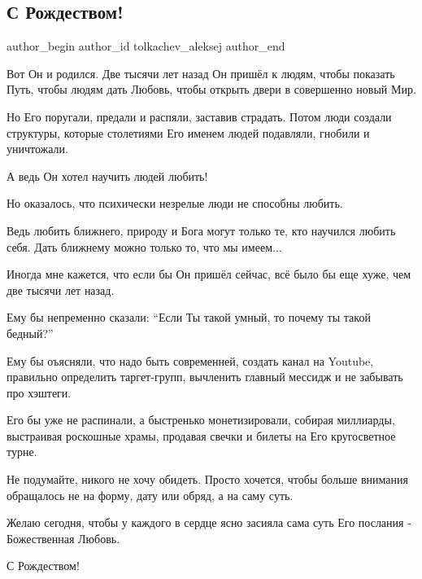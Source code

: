  
 
 
 
 
 
\subsection{С Рождеством!}
\label{sec:06_01_2022.fb.tolkachev_aleksej.1.s_rozhdestvom}
 
\ifcmt
 author_begin
   author_id tolkachev_aleksej
 author_end
\fi

Вот Он и родился. Две тысячи лет назад Он пришёл к людям, чтобы показать Путь,
чтобы людям дать Любовь, чтобы открыть двери в совершенно новый Мир. 


Но Его поругали, предали и распяли, заставив страдать. Потом люди создали
структуры, которые столетиями Его именем людей подавляли, гнобили и уничтожали. 

А ведь Он хотел научить людей любить! 

Но оказалось, что психически незрелые люди не способны любить. 

Ведь любить ближнего, природу и Бога могут только те, кто научился любить себя.
Дать ближнему можно только то, что мы имеем... 

Иногда мне кажется, что если бы Он пришёл сейчас, всё было бы еще хуже, чем две
тысячи лет назад. 

Ему бы непременно сказали: \enquote{Если Ты такой умный, то почему ты такой бедный?}

Ему бы оъясняли, что надо быть современней, создать канал на Youtube, правильно
определить таргет-групп, вычленить главный мессидж и не забывать про хэштеги. 

Его бы уже не распинали, а быстренько монетизировали, собирая миллиарды,
выстраивая роскошные храмы, продавая свечки и билеты на Его кругосветное турне. 

Не подумайте, никого не хочу обидеть. Просто хочется, чтобы больше внимания
обращалось не на форму, дату или обряд, а на саму суть. 

Желаю сегодня, чтобы у каждого в сердце ясно засияла сама суть Его послания -
Божественная Любовь. 

С Рождеством!

